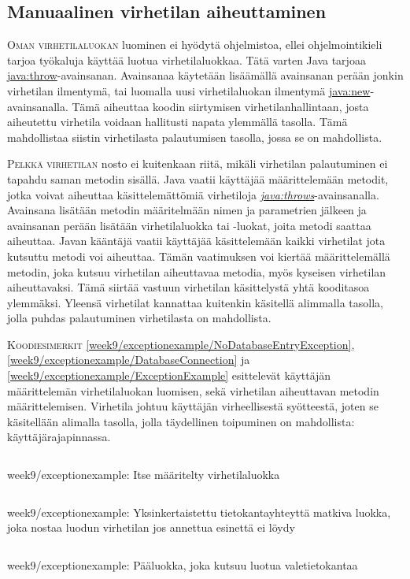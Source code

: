 \documentclass[openany]{book}
\newcommand{\newthought}[1]{\smallskip\textsc{#1}}
\newcommand{\java}[1]{\underline{\gls{java:#1}}}
\newcommand{\newjava}[1]{\textit{\java{#1}}}
\newcommand{\code}[3]{
	\begin{listing}
		\linespread{0.85}
		\inputminted{java}{OhjelmointiopasEsimerkit/src/#1/#2.java}
		\caption{#1: #3}
		\label{#1/#2}
	\end{listing}
}
\begin{document}
\subsection{Manuaalinen virhetilan aiheuttaminen}
\label{throws}

\newthought{Oman virhetilaluokan} luominen ei hyödytä ohjelmistoa, ellei ohjelmointikieli tarjoa
työkaluja käyttää luotua virhetilaluokkaa. Tätä varten Java tarjoaa \java{throw}-avainsanan.
Avainsanaa käytetään lisäämällä avainsanan perään jonkin virhetilan ilmentymä, tai luomalla uusi
virhetilaluokan ilmentymä \java{new}-avainsanalla. Tämä aiheuttaa koodin siirtymisen
virhetilanhallintaan, josta aiheutettu virhetila voidaan hallitusti napata ylemmällä tasolla. Tämä
mahdollistaa siistin virhetilasta palautumisen tasolla, jossa se on mahdollista. 

\newthought{Pelkkä virhetilan} nosto ei kuitenkaan riitä, mikäli virhetilan palautuminen ei
tapahdu saman metodin sisällä. Java vaatii käyttäjää määrittelemään metodit, jotka voivat
aiheuttaa käsittelemättömiä virhetiloja \newjava{throws}-avainsanalla. Avainsana lisätään metodin
määritelmään nimen ja parametrien jälkeen ja avainsanan perään lisätään virhetilaluokka tai 
-luokat, joita metodi saattaa aiheuttaa. Javan kääntäjä vaatii käyttäjää käsittelemään kaikki
virhetilat jota kutsuttu metodi voi aiheuttaa. Tämän vaatimuksen voi kiertää määrittelemällä
metodin, joka kutsuu virhetilan aiheuttavaa metodia, myös kyseisen virhetilan aiheuttavaksi. Tämä
siirtää vastuun virhetilan käsittelystä yhtä kooditasoa ylemmäksi. Yleensä virhetilat kannattaa
kuitenkin käsitellä alimmalla tasolla, jolla puhdas palautuminen virhetilasta on mahdollista.

\newthought{Koodiesimerkit} \ref{week9/exceptionexample/NoDatabaseEntryException},
\ref{week9/exceptionexample/DatabaseConnection} ja \ref{week9/exceptionexample/ExceptionExample}
esittelevät käyttäjän määrittelemän virhetilaluokan luomisen, sekä virhetilan aiheuttavan metodin
määrittelemisen. Virhetila johtuu käyttäjän virheellisestä syötteestä, joten se käsitellään
alimalla tasolla, jolla täydellinen toipuminen on mahdollista: käyttäjärajapinnassa.

\code{week9/exceptionexample}{NoDatabaseEntryException}{Itse määritelty virhetilaluokka}
\code{week9/exceptionexample}{DatabaseConnection}{Yksinkertaistettu tietokantayhteyttä matkiva
luokka, joka nostaa luodun virhetilan jos annettua esinettä ei löydy}
\code{week9/exceptionexample}{ExceptionExample}{Pääluokka, joka kutsuu luotua valetietokantaa}
\end{document}
